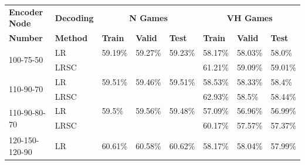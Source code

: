 \documentclass{article}
\begin{document}
\begin{appendix}
\bgroup
\def\arraystretch{1.7}%
{
\begin{table}
\begin{threeparttable}
\centering
\begin{tabularx}{\textwidth}{|X|l|l|l|l|l|l|l|}
\hline
\textbf{Encoder Node}& \textbf{Decoding} & \multicolumn{3}{c|}{\textbf{N Games}} & \multicolumn{3}{c|}{\textbf{VH Games}} \\\cline{3-8}

\textbf{Number} & \textbf{Method} & \textbf{Train} & \textbf{Valid} & \textbf{Test}  & \textbf{Train} & \textbf{Valid} & \textbf{Test}\\
\hline
\multirow{2}{*}{100-75-50}                                                         & LR                                                                         & 59.19\%  & 59.27\% & 59.23\% & 58.17\%  & 58.03\%  & 58.0\%  \\ \cline{2-8} 
& LRSC                                                                       &          &         &         &     61.21\%     &     59.09\%     &    59.01\%     \\ \hline
\multirow{2}{*}{110-90-70}                                                         & LR                                                                         & 59.51\%  & 59.46\% & 59.51\% & 58.53\%  & 58.33\%  & 58.4\%  \\ \cline{2-8} 
                                                                                   & LRSC                                                                       &          &         &         &     62.93\%     &   58.5\%       &   58.44\%      \\ \hline
\multirow{2}{*}{110-90-80-70}                                                         & LR                                                                         & 59.5\%  & 59.56\% & 59.48\% & 57.09\%  & 56.96\%  & 56.99\%  \\ \cline{2-8} 
                                                                                   & LRSC                                                                       &          &         &         &      60.17\%    &    57.57\%      &   57.37\%      \\ \hline
\multirow{2}{*}{120-150-120-90}                                                    & LR                                                                         &     60.61\%     &   60.58\%      &    60.62\%     & 58.17\%  & 58.04\%  & 57.99\% \\ \cline{2-8} 

\end{tabularx}
\end{threeparttable}
\end{table}}
\end{appendix}
\end{document}
